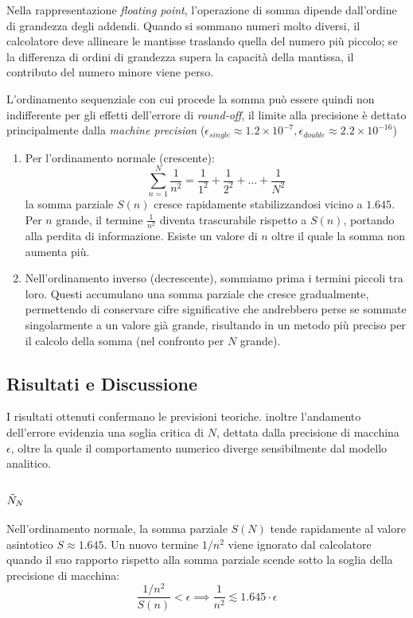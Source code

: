 Nella rappresentazione \textit{floating point}, l'operazione di somma dipende dall'ordine di grandezza degli addendi. Quando si sommano numeri molto diversi, il calcolatore deve allineare le mantisse traslando quella del numero più piccolo; se la differenza di ordini di grandezza supera la capacità della mantissa, il contributo del numero minore viene perso.

\noindent L'ordinamento sequenziale con cui procede la somma può essere quindi non indifferente per gli effetti dell'errore di \textit{round-off}, il limite alla precisione è dettato principalmente dalla \textit{machine precision} ($\epsilon_{single} \approx 1.2 \times 10^{-7}, \epsilon_{double} \approx 2.2 \times 10^{-16}$)
\begin{enumerate}

    \item Per l'ordinamento normale (crescente):
    $$
    \sum_{n=1}^N \frac{1}{n^2} = \frac{1}{1^2} + \frac{1}{2^2} + \dots + \frac{1}{N^2}
    $$
    la somma parziale $S(n)$ cresce rapidamente stabilizzandosi vicino a $1.645$. Per $n$ grande, il termine $\frac{1}{n^2}$ diventa trascurabile rispetto a $S(n)$, portando alla perdita di informazione. Esiste un valore di $n$ oltre il quale la somma non aumenta più.

    \item Nell'ordinamento inverso (decrescente), sommiamo prima i termini piccoli tra loro. Questi accumulano una somma parziale che cresce gradualmente, permettendo di conservare cifre significative che andrebbero perse se sommate singolarmente a un valore già grande, risultando in un metodo più preciso per il calcolo della somma (nel confronto per $N$ grande).
\end{enumerate}

\subsection{Risultati e Discussione}
I risultati ottenuti confermano le previsioni teoriche. inoltre l'andamento dell'errore evidenzia una soglia critica di $N$, dettata dalla precisione di macchina $\epsilon$, oltre la quale il comportamento numerico diverge sensibilmente dal modello analitico.

\subsubsection{$\Tilde{N}_N$}
\noindent Nell'ordinamento normale, la somma parziale $S(N)$ tende rapidamente al valore asintotico $S \approx 1.645$. Un nuovo termine $1/n^2$ viene ignorato dal calcolatore quando il suo rapporto rispetto alla somma parziale scende sotto la soglia della precisione di macchina:$$    \frac{1/n^2}{S(n)} < \epsilon \implies \frac{1}{n^2} \lesssim 1.645 \cdot \epsilon$$

